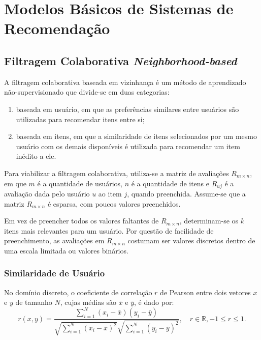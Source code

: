 \section{Modelos Básicos de Sistemas de Recomendação}
\subsection{Filtragem Colaborativa \textit{Neighborhood-based}} A filtragem
colaborativa baseada em vizinhança é um método de aprendizado não-supervisionado
que divide-se em duas categorias:
\begin{enumerate}
    \item baseada em usuário, em
que as preferências similares entre usuários são utilizadas para recomendar
itens entre si;
    \item baseada em itens, em que a similaridade de itens selecionados
por um mesmo usuário com os demais disponíveis é utilizada para recomendar um
item inédito a ele.
\end{enumerate}

Para viabilizar a filtragem colaborativa, utiliza-se a matriz de avaliações
$R_{m \times n}$, em que $m$ é a quantidade de usuários, $n$ é a quantidade de
itens e $R_{uj}$ é a avaliação dada pelo usuário $u$ ao item $j$, quando
preenchida. Assume-se que a matriz $R_{m \times n}$ é esparsa, com poucos
valores preenchidos.

Em vez de preencher todos os valores faltantes de $R_{m \times n}$,
determinam-se os $k$ itens mais relevantes para um usuário. Por questão de
facilidade de preenchimento, as avaliações em $R_{m \times n}$ costumam ser
valores discretos dentro de uma escala limitada ou valores binários.

\subsubsection{Similaridade de Usuário}
No domínio discreto, o coeficiente de correlação $r$ de Pearson entre dois vetores $x$ e $y$ de
tamanho $N$, cujas médias são $\bar{x}$ e $\bar{y}$, é dado por:
\begin{equation}    
    r(x,y) = \frac{\sum_{i=1}^{N}(x_i - \bar{x})(y_i - \bar{y})}{\sqrt{\sum_{i=1}^{N}(x_i - \bar{x})^2} \sqrt{\sum_{i=1}^{N}(y_i - \bar{y})^2}}, \quad r \in \mathbb{R}, -1 \leq r \leq 1.
\end{equation}

